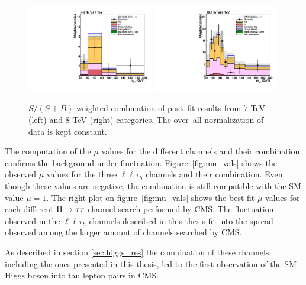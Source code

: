 \begin{figure}
\begin{center}
  \includegraphics[width=0.49\textwidth]{4_Analisys/pics/postfit/postfit_ssb_weight_7TeV.pdf}
  \includegraphics[width=0.49\textwidth]{4_Analisys/pics/postfit/postfit_ssb_weight_8TeV.pdf}\\
  \caption{$S / (S+B)$ weighted combination of post--fit results from 7 TeV (left) and 8 TeV (right) categories. The over--all normalization of data is kept constant.}
  \label{fig:sbweight}
\end{center}
\end{figure}


{\color{red}
The computation of the $\mu$ values for the different channels and their combination confirms the background under-fluctuation. Figure~\ref{fig:mu_vals} shows the observed $\mu$ values for the three $\ell\ell\tau_h$ channels and their combination. Even though these values are negative, the combination is still compatible with the SM value $\mu = 1$. The right plot on figure~\ref{fig:mu_vals} shows the best fit $\mu$ values for each different $\mathrm{H}\rightarrow\tau\tau$ channel search performed by CMS. The fluctuation observed in the $\ell\ell\tau_h$ channels described in this thesis fit into the spread observed among the larger amount of channels searched by CMS. 

As described in section \ref{sec:higgs_res} the combination of these channels, including the ones presented in this thesis, led to the first observation of the SM Higgs boson into tau lepton pairs in CMS.
}

